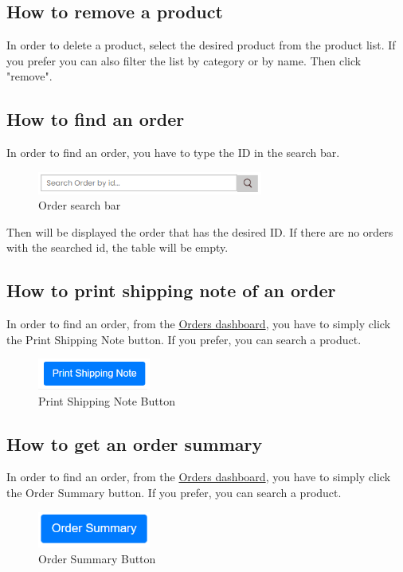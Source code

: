 \subsection{How to remove a product}\label{_removeProduct}
In order to delete a product, select the desired product from the product list. If you prefer you can also filter the list by category or by name. Then click "remove".

\subsection{How to find an order}\label{_findOrder}
In order to find an order, you have to type the ID in the search bar.
\begin{figure}[H]
    \centering
    \includegraphics[width=20em]{res/images/venditore/ordersearchbar.png}
    \caption{Order search bar}
\end{figure}
Then will be displayed the order that has the desired ID. If there are no orders with the searched id, the table will be empty.

\subsection{How to print shipping note of an order}\label{_shippingNote}
In order to find an order, from the \hyperref[_ordermanagement]{Orders dashboard}, you have to simply click the Print Shipping Note button. If you prefer, you can search a product.
\begin{figure}[H]
    \centering
    \includegraphics[width=10em]{res/images/venditore/printshippingnotebutton.png}
    \caption{Print Shipping Note Button}
\end{figure}

\subsection{How to get an order summary}\label{_orderSummary}
In order to find an order, from the \hyperref[_ordermanagement]{Orders dashboard}, you have to simply click the Order Summary button. If you prefer, you can search a product.
\begin{figure}[H]
    \centering
    \includegraphics[width=10em]{res/images/venditore/ordersummarybutton.png}
    \caption{Order Summary Button}
\end{figure}

